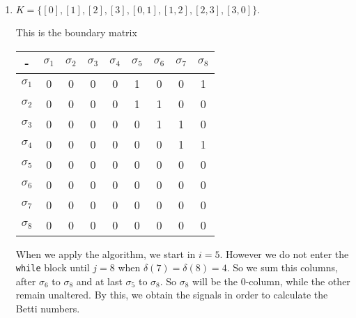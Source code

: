 \begin{enumerate}
    \item    $K = \{[0], [1], [2], [3], [0, 1], [1, 2], [2, 3], [3, 0]\}.$
    
    This is the boundary matrix

    \begin{center}
        \begin{tabular}{|c|c|c|c|c|c|c|c|c|}
        \hline
        -          & $\sigma_1$ & $\sigma_2$ & $\sigma_3$ & $\sigma_4$ & $\sigma_5$ & $\sigma_6$ & $\sigma_7$ & $\sigma_8$ \\ \hline
        $\sigma_1$ & 0          & 0          & 0          & 0          & 1          & 0          & 0          & 1          \\ \hline
        $\sigma_2$ & 0          & 0          & 0          & 0          & 1          & 1          & 0          & 0          \\ \hline
        $\sigma_3$ & 0          & 0          & 0          & 0          & 0          & 1          & 1          & 0          \\ \hline
        $\sigma_4$ & 0          & 0          & 0          & 0          & 0          & 0          & 1          & 1          \\ \hline
        $\sigma_5$ & 0          & 0          & 0          & 0          & 0          & 0          & 0          & 0          \\ \hline
        $\sigma_6$ & 0          & 0          & 0          & 0          & 0          & 0          & 0          & 0          \\ \hline
        $\sigma_7$ & 0          & 0          & 0          & 0          & 0          & 0          & 0          & 0          \\ \hline
        $\sigma_8$ & 0          & 0          & 0          & 0          & 0          & 0          & 0          & 0          \\ \hline
        \end{tabular}
    \end{center}

    When we apply the algorithm, we start in $i = 5$. However we do not enter
    the \texttt{while} block until $j = 8$ when $\delta(7) =
    \delta(8) = 4$. So we sum this columns, after $\sigma_6$ to $\sigma_8$ and
    at last $\sigma_5$ to $\sigma_8$. So $\sigma_8$ will be the 0-column,
    while the other remain unaltered. By this, we obtain the signals in order
    to calculate the Betti numbers. 


\end{enumerate}
